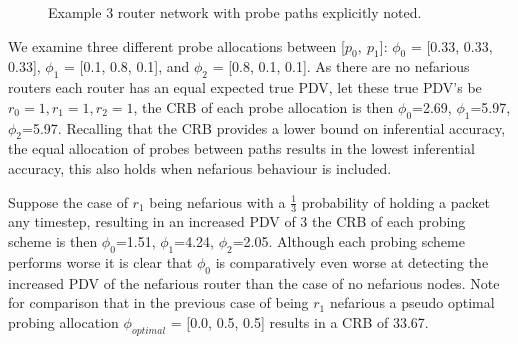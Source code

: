 \begin{figure}[H]
    \centering
    \caption{Example 3 router network with probe paths explicitly noted.}
    \label{fig:fimex3routereg}
\end{figure}

We examine three different probe allocations between [$p_0,\:p_1$]: $\phi_0$ = [0.33, 0.33, 0.33],  $\phi_1$ = [0.1, 0.8, 0.1], and $\phi_2$ = [0.8, 0.1, 0.1]. As there are no nefarious routers each router has an equal expected true PDV, let these true PDV's be $r_0=1, r_1=1, r_2=1$, the CRB of each probe allocation is then $\phi_0$=2.69, $\phi_1$=5.97, $\phi_2$=5.97. Recalling that the CRB provides a lower bound on inferential accuracy, the equal allocation of probes between paths results in the lowest inferential accuracy, this also holds when nefarious behaviour is included.\par
Suppose the case of $r_1$ being nefarious with a $\frac{1}{3}$ probability of holding a packet any timestep, resulting in an increased PDV of 3 the CRB of each probing scheme is then $\phi_0$=1.51, $\phi_1$=4.24, $\phi_2$=2.05. Although each probing scheme performs worse it is clear that $\phi_0$ is comparatively even worse at detecting the increased PDV of the nefarious router than the case of no nefarious nodes. Note for comparison that in the previous case of being $r_1$ nefarious a pseudo optimal probing allocation $\phi_{optimal}$ = [0.0, 0.5, 0.5] results in a CRB of 33.67.

